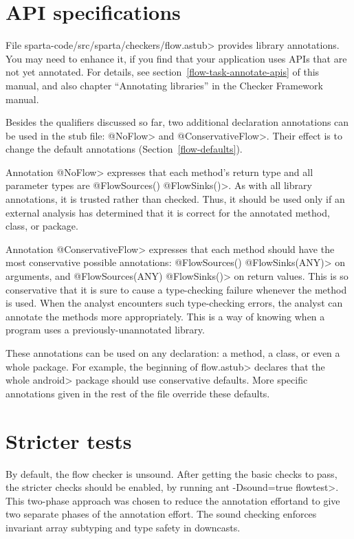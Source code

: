 \section{API specifications}

File \<sparta-code/src/sparta/checkers/flow.astub> provides library
annotations.  You may need to enhance it, if you find that your application
uses APIs that are not yet annotated.  For details, see
section~\ref{flow-task-annotate-apis} of this manual, and also 
chapter
``Annotating libraries'' in the Checker Framework manual.

\label{ConservativeFlow}

Besides the qualifiers discussed so far, two additional declaration
annotations can be used in the stub file: \<@NoFlow> and \<@ConservativeFlow>.
Their effect is to change the default annotations (Section~\ref{flow-defaults}).

Annotation \<@NoFlow> expresses that each method's return type and all
parameter types are \<@FlowSources({}) @FlowSinks({})>.  As with all
library annotations, it is trusted rather than checked.  Thus, it should be
used only if an external analysis has determined that it is correct for the
annotated method, class, or package.

Annotation \<@ConservativeFlow> expresses that each method should have the
most conservative possible annotations:
  \<@FlowSources({}) @FlowSinks(ANY)> on arguments, and
  \<@FlowSources(ANY) @FlowSinks({})> on return values.
This is so conservative that it is sure to cause a type-checking failure
whenever the method is used.
When the analyst encounters such type-checking errors, the analyst can
annotate the methods more appropriately.  This is a way of knowing when a
program uses a previously-unannotated library.

These annotations can be used on any declaration: a method, a class,
or even a whole package.
For example, the beginning of \<flow.astub> declares that the
whole \<android> package should use conservative defaults.
More specific annotations given in the rest of the file override these
defaults.


\section{Stricter tests}

By default, the flow checker is unsound.  After getting the basic checks to pass, the
 stricter checks should be enabled, by running \<ant -Dsound=true flowtest>.
This two-phase approach was chosen to reduce
the annotation effortand to give two separate phases of
the annotation effort.
 The sound checking enforces invariant 
array subtyping and type safety in downcasts.


